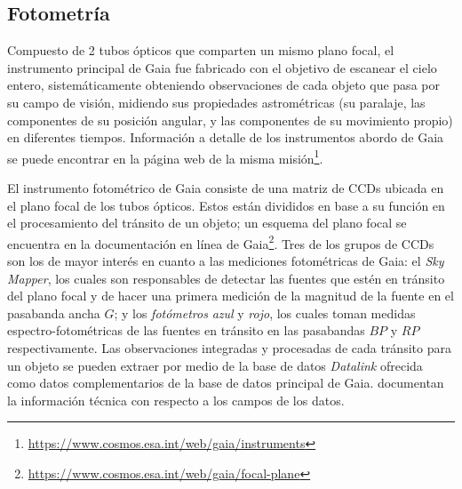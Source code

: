 \subsection{Fotometría}

Compuesto de 2 tubos ópticos que comparten un mismo plano focal, el instrumento
principal de Gaia fue fabricado con el objetivo de escanear el cielo entero,
sistemáticamente obteniendo observaciones de cada objeto que pasa por su campo
de visión, midiendo sus propiedades astrométricas (su paralaje, las componentes
de su posición angular, y las componentes de su movimiento propio) en diferentes
tiempos. Información a detalle de los instrumentos abordo de Gaia se puede
encontrar en la página web de la misma
misión\footnote{\url{https://www.cosmos.esa.int/web/gaia/instruments}}. 

El instrumento fotométrico de Gaia consiste de una matriz de CCDs ubicada en el
plano focal de los tubos ópticos. Estos están divididos en base a su función en
el procesamiento del tránsito de un objeto; un esquema del plano focal se
encuentra en la documentación en línea de
Gaia\footnote{\url{https://www.cosmos.esa.int/web/gaia/focal-plane}}. Tres de
los grupos de CCDs son los de mayor interés en cuanto a las mediciones
fotométricas de Gaia: el \textit{Sky Mapper}, los cuales son responsables de
detectar las fuentes que estén en tránsito del plano focal y de hacer una
primera medición de la magnitud de la fuente en el pasabanda ancha $G$; y los
\textit{fotómetros} \textit{azul} y \textit{rojo}, los cuales toman medidas
espectro-fotométricas de las fuentes en tránsito en las pasabandas $BP$ y $RP$
respectivamente. Las observaciones integradas y procesadas de cada tránsito para
un objeto se pueden extraer por medio de la base de datos \textit{Datalink}
ofrecida como datos complementarios de la base de datos principal de Gaia.
 documentan la información
técnica con respecto a los campos de los datos.

